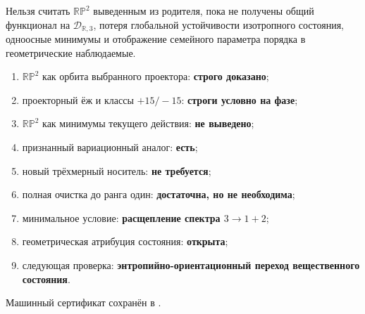 \begin{nogocriterion}
Нельзя считать $\mathbb{RP}^2$ выведенным из родителя, пока не получены
общий функционал на $\mathcal D_{\mathbb R,3}$, потеря глобальной
устойчивости изотропного состояния, одноосные минимумы и отображение
семейного параметра порядка в геометрические наблюдаемые.
\end{nogocriterion}

\begin{protocol}
\begin{enumerate}
 \item $\mathbb{RP}^2$ как орбита выбранного проектора:
 \textbf{строго доказано};
 \item проекторный ёж и классы $+15/-15$:
 \textbf{строги условно на фазе};
 \item $\mathbb{RP}^2$ как минимумы текущего действия:
 \textbf{не выведено};
 \item признанный вариационный аналог:
 \textbf{есть};
 \item новый трёхмерный носитель:
 \textbf{не требуется};
 \item полная очистка до ранга один:
 \textbf{достаточна, но не необходима};
 \item минимальное условие:
 \textbf{расщепление спектра $3\to1+2$};
 \item геометрическая атрибуция состояния:
 \textbf{открыта};
 \item следующая проверка:
 \textbf{энтропийно-ориентационный переход вещественного состояния}.
\end{enumerate}
\end{protocol}

Машинный сертификат сохранён в
.